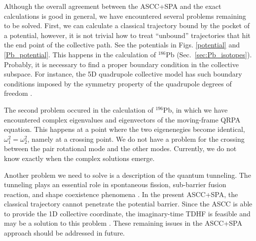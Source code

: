 \documentclass[%
superscriptaddress,
showpacs,
nofootinbib,
amsmath,amssymb,
aps,
prc,
twocolumn,
floatfix ]%
{revtex4-1}
\begin{document}
Although the overall agreement between the ASCC+SPA and the exact
calculations is good in general,
we have encountered several problems remaining to be solved.
First, we can calculate a classical trajectory bound by the
pocket of a potential, however, it is not trivial how to treat
``unbound'' trajectories that hit the end point of the collective path.
See the potentials in Figs. \ref{potential} and \ref{Pb_potential}.
This happens in the calculation of ${}^{186}$Pb
(Sec.~\ref{sec:Pb_isotopes}).
Probably, it is necessary to find a proper boundary condition
in the collective subspace.
For instance, the 5D quadrupole collective model has
such boundary conditions imposed by the symmetry property of
the quadrupole degrees of freedom \cite{KB67}.

The second problem occured in the calculation of $^{196}$Pb,
in which we have encountered complex eigenvalues and eigenvectors
of the moving-frame QRPA equation.
This happens at a point where the two eigenenegies become
identical, $\omega_1^2=\omega_2^2$, namely at a crossing point.
We do not have a problem for the crossing between the pair rotational
mode and the other modes.
Currently, we do not know exactly when the complex solutions emerge.

Another problem we need to solve is a description of the
quantum tunneling.
The tunneling plays an essential role in
spontaneous fission, sub-barrier fusion reaction, and
shape coexistence phenomena \cite{NMMY16,WN16,WN17,HNMM07,HNMM08}.
In the present ASCC+SPA, the classical trajectory
cannot penetrate the potential barrier.
Since the ASCC is able to provide the 1D collective coordinate,
the imaginary-time TDHF is feasible and may be a solution
to this problem \cite{Neg82}.
These remaining issues in the ASCC+SPA approach should be
addressed in future.

\end{document}
